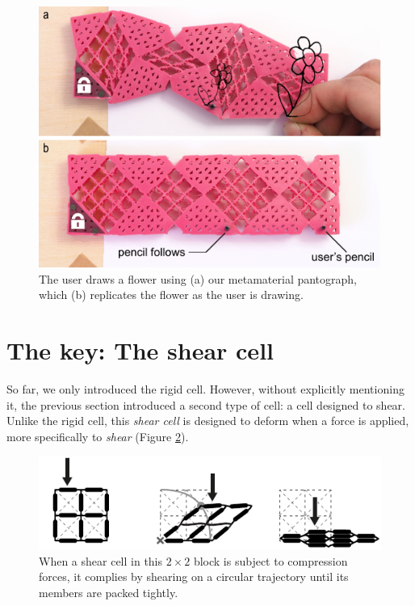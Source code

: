\begin{figure} [h]  
    \includegraphics[width=\textwidth]{chapters/metamaterial-mechanisms-FIG/11-pantograph.pdf}
    \caption[Short figure name.]{The user draws a flower using (a) our metamaterial pantograph, which (b) replicates the flower as the user is drawing. 
    \label{fig:11-pantograph}}
\end{figure}


\section{The key: The shear cell}
\label{section:shear-cell}

So far, we only introduced the rigid cell. However, without explicitly mentioning it, the previous section introduced a second type of cell: a cell designed to shear. Unlike the rigid cell, this \textit{shear cell} is designed to deform when a force is applied, more specifically to \textit{shear} (Figure \ref{fig:12-shear-cell-deformation}). 

\begin{figure} [h]  
    \includegraphics[width=\textwidth]{chapters/metamaterial-mechanisms-FIG/12-shear-cell-deformation.pdf}
    \caption[Short figure name.]{When a shear cell in this $2 \times 2$ block is subject to compression forces, it complies by shearing on a circular trajectory until its members are packed tightly.
    \label{fig:12-shear-cell-deformation}}
\end{figure}

